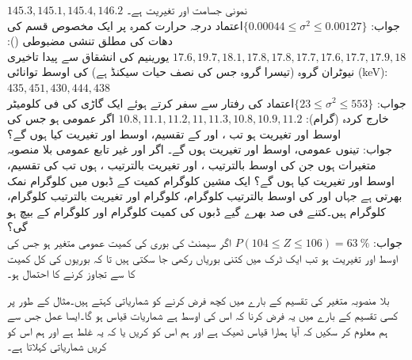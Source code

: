 \quad
$145.3, 145.1, 145.4,146.2$
\quad
نمونی جسامت  اور تغیریت  ہے۔\\
جواب:\quad
$\text{اعتماد} \{0.00044\le \sigma^2\le 0.00127\}$
\quad
درجہ حرارت کمرہ پر ایک مخصوص قسم کی دھات کی مطلق تنشی مضبوطی ():
$17.6,19.7,18.1,17.8,17.8,17.7,17.6,17.7,17.9,18$
\quad
یورینیم  کی انشقاق سے پیدا تاخیری نیوٹران  گروہ (تیسرا گروہ جس کی نصف حیات   سیکنڈ ہے) کی اوسط توانائی (\si{\kilo\electronvolt}):
$435,451,430,444,438$\\
جواب:\quad
$\text{اعتماد} \{23\le\sigma^2\le553\}$
\quad
{} کی رفتار سے سفر کرتے ہوئے ایک گاڑی کی فی کلومیٹر خارج کردہ
  (گرام): $10.8,11.1,11.2,11,11.3,10.8,10.9,11.2$  
\quad
اگر  عمومی ہو جس کی اوسط  اور تغیریت  ہو تب ،  اور  کے تقسیم، اوسط اور تغیریت کیا ہوں گے؟\\
جواب:\quad
تینوں عمومی، اوسط  اور تغیریت  ہوں گے۔
\quad
اگر  اور  غیر تابع عمومی بلا منصوبہ متغیرات ہوں جن کی اوسط بالترتیب ،  اور تغیریت  بالترتیب ،   ہوں تب  کی تقسیم، اوسط اور تغیریت کیا ہوں گے؟
\quad
ایک مشین  کلوگرام کمیت کے ڈبوں میں  کلوگرام نمک بھرتی ہے جہاں  اور  کی اوسط بالترتیب  کلوگرام،  کلوگرام اور تغیریت بالترتیب  کلوگرام،  کلوگرام ہیں۔کتنے فی صد بھرے گیے  ڈبوں کی کمیت  کلوگرام اور  کلوگرام کے بیچ ہو گی؟\\
جواب:\quad
$P(104\le Z\le 106)=\SI{63}{\percent}$
\quad
اگر سیمنٹ کی بوری کی کمیت  عمومی متغیر ہو جس کی اوسط  اور تغیریت  ہو تب ایک ٹرک میں کتنی بوریاں رکھی جا سکتی ہیں تا کہ بوریوں کی  کل کمیت کا  سے تجاوز کرنے کا احتمال  ہو۔

بلا منصوبہ متغیر کی تقسیم کے بارے میں کچھ فرض کرنے کو شماریاتی  کہتے ہیں۔مثال کے طور پر کسی تقسیم کے بارے میں یہ فرض کرنا کہ اس کی اوسط  ہے شماریات قیاس ہو گا۔ایسا عمل  جس سے ہم معلوم کر سکیں کہ آیا ہمارا قیاس  ٹھیک ہے اور ہم اس کو  کریں یا کہ یہ غلط ہے اور ہم اس کو  کریں شماریاتی  کہلاتا ہے۔

